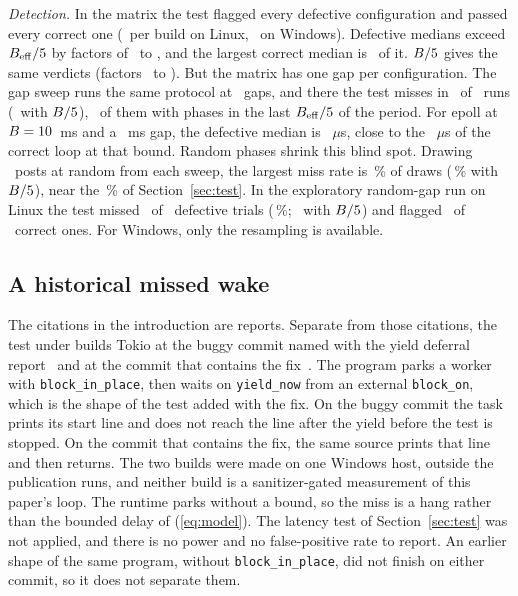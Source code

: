 \emph{Detection.} In the matrix the test flagged every defective configuration and passed
every correct one (\WakeDetectConfigsLinux\ per build on Linux, \WakeDetectConfigsWindows\ on
Windows). Defective medians exceed $B_{\mathrm{eff}}/5$ by factors of
\WakeDetectFactorDefectMin\ to \WakeDetectFactorDefectMax, and the largest correct median is
\WakeDetectFactorFixedMax\ of it. $B/5$ gives the same verdicts (factors
\WakeDetectFactorBDefectMin\ to \WakeDetectFactorBDefectMax). But the matrix has one gap per
configuration. The gap sweep runs the same protocol at \WakeSweepSteps\ gaps, and there the test
misses in \WakeSweepMissedTotal\ of \WakeSweepRunsTotal\ runs (\WakeSweepMissedBTotal\ with
$B/5$), \WakeSweepMissedLateTotal\ of them with phases in the last
$B_{\mathrm{eff}}/5$ of the period. For epoll at $B = 10$~ms and a
\WakeSweepEpollMinMedianGapMsTenMs~ms gap, the defective median is
\WakeSweepEpollMinMedianTenMs~$\mu$s, close to the \WakeBoundEpollFixedTenMs~$\mu$s of the
correct loop at that bound. Random phases shrink this blind spot. Drawing \WakeTestPosts\ posts
at random from each sweep, the largest miss rate is \WakeResampleMissMaxPct\,\% of draws
(\WakeResampleMissBMaxPct\,\% with $B/5$), near the \WakeBinomialMissPct\,\% of
Section~\ref{sec:test}. In the exploratory random-gap run on Linux the test missed
\WakeRandomDefectMissed\ of \WakeRandomDefectTrials\ defective trials
(\WakeRandomDefectMissPct\,\%; \WakeRandomDefectMissedB\ with $B/5$) and flagged
\WakeRandomFixedFlagged\ of \WakeRandomFixedTrials\ correct ones. For Windows, only the
resampling is available.

\subsection{A historical missed wake}
\label{sec:historical}
The citations in the introduction are reports. Separate from those citations, the test under
 builds Tokio at the buggy commit named with the
yield deferral report~\cite{quininer2024yieldbug} and at the commit that contains the
fix~\cite{quininer2024yieldfix}. The program parks a worker with \texttt{block\_in\_place},
then waits on \texttt{yield\_now} from an external \texttt{block\_on}, which is the shape of
the test added with the fix. On the buggy commit the task prints its start line and does not
reach the line after the yield before the test is stopped. On the commit that contains the
fix, the same source prints that line and then returns. The two builds were made on one
Windows host, outside the publication runs, and neither build is a sanitizer-gated
measurement of this paper's loop. The runtime parks without a bound, so the miss is a hang
rather than the bounded delay of (\ref{eq:model}). The latency test of
Section~\ref{sec:test} was not applied, and there is no power and no false-positive rate to
report. An earlier shape of the same program, without \texttt{block\_in\_place}, did not
finish on either commit, so it does not separate them.

